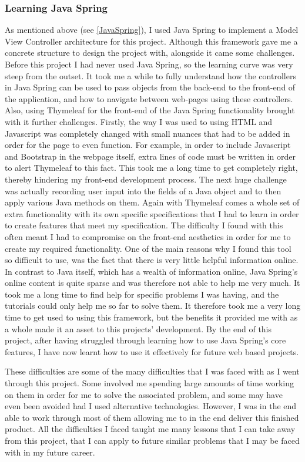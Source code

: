 \subsubsection{Learning Java Spring}
As mentioned above (see \ref{JavaSpring}), I used Java Spring to implement a Model View Controller architecture for this project. Although this framework gave me a concrete structure to design the project with, alongside it came some challenges. Before this project I had never used Java Spring, so the learning curve was very steep from the outset. It took me a while to fully understand how the controllers in Java Spring can be used to pass objects from the back-end to the front-end of the application, and how to navigate between web-pages using these controllers. Also, using Thymeleaf for the front-end of the Java Spring functionality brought with it further challenges. Firstly, the way I was used to using HTML and Javascript was completely changed with small nuances that had to be added in order for the page to even function. For example, in order to include Javascript and Bootstrap in the webpage itself, extra lines of code must be written in order to alert Thymeleaf to this fact. This took me a long time to get completely right, thereby hindering my front-end development process. The next huge challenge was actually recording user input into the fields of a Java object and to then apply various Java methods on them. Again with Thymeleaf comes a whole set of extra functionality with its own specific specifications that I had to learn in order to create features that meet my specification. The difficulty I found with this often meant I had to compromise on the front-end aesthetics in order for me to create my required functionality. One of the main reasons why I found this tool so difficult to use, was the fact that there is very little helpful information online. In contrast to Java itself, which has a wealth of information online, Java Spring's online content is quite sparse and was therefore not able to help me very much. It took me a long time to find help for specific problems I was having, and the tutorials could only help me so far to solve them. It therefore took me a very long time to get used to using this framework, but the benefits it provided me with as a whole made it an asset to this projects' development. By the end of this project, after having struggled through learning how to use Java Spring's core features, I have now learnt how to use it effectively for future web based projects.

These difficulties are some of the many difficulties that I was faced with as I went through this project. Some involved me spending large amounts of time working on them in order for me to solve the associated problem, and some may have even been avoided had I used alternative technologies. However, I was in the end able to work through most of them allowing me to in the end deliver this finished product. All the difficulties I faced taught me many lessons that I can take away from this project, that I can apply to future similar problems that I may be faced with in my future career. 

